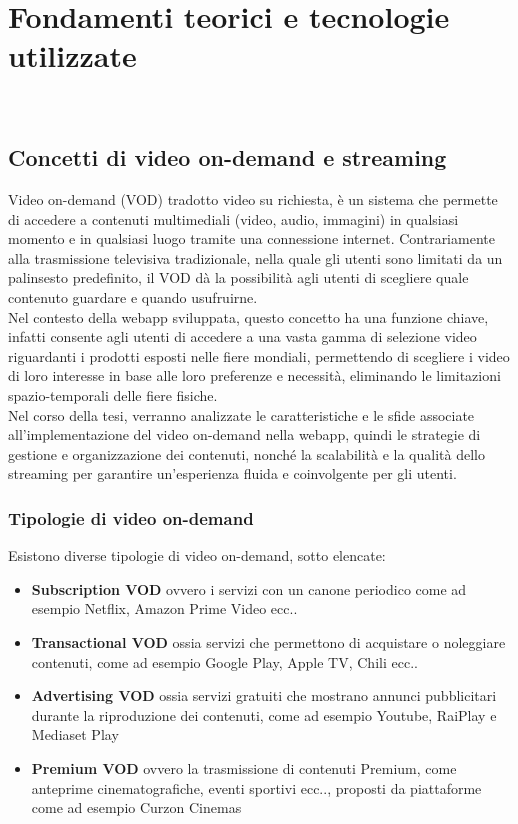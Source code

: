 \chapter{Fondamenti teorici e tecnologie utilizzate}
\label{cap:fondamentiteorici}
\\

\section{Concetti di video on-demand e streaming}
Video on-demand (VOD) tradotto video su richiesta, è un sistema che permette di accedere a contenuti multimediali (video, audio, immagini) 
in qualsiasi momento e in qualsiasi luogo tramite una connessione internet.
Contrariamente alla trasmissione televisiva tradizionale, nella quale gli utenti sono limitati da un palinsesto predefinito, 
il VOD dà la possibilità agli utenti di scegliere quale contenuto guardare e quando usufruirne.\\
Nel contesto della webapp sviluppata, questo concetto ha una funzione chiave, infatti consente agli utenti di accedere a una vasta gamma di selezione video riguardanti 
i prodotti esposti nelle fiere mondiali, 
permettendo di scegliere i video di loro interesse in base alle loro preferenze e necessità, eliminando le limitazioni spazio-temporali delle fiere fisiche.\\
Nel corso della tesi, verranno analizzate le caratteristiche e le sfide associate all'implementazione del video on-demand nella webapp, quindi le strategie 
di gestione e organizzazione dei contenuti, nonché la scalabilità e la qualità dello streaming per garantire un'esperienza fluida e coinvolgente per gli utenti.
\subsection{Tipologie di video on-demand}
Esistono diverse tipologie di video on-demand, sotto elencate:

\begin{itemize}
    \item \textbf{Subscription VOD} ovvero i servizi con un canone periodico come ad esempio Netflix, Amazon Prime Video ecc..\\
    \item \textbf{Transactional VOD} ossia servizi che permettono di acquistare o noleggiare contenuti, come ad esempio Google Play, Apple TV, Chili ecc..\\
    \item \textbf{Advertising VOD} ossia servizi gratuiti che mostrano annunci pubblicitari durante la riproduzione dei contenuti, come ad esempio Youtube, RaiPlay e Mediaset Play\\
    \item \textbf{Premium VOD} ovvero la trasmissione di contenuti Premium, come anteprime cinematografiche, eventi sportivi ecc.., proposti da piattaforme come ad esempio Curzon Cinemas\\
\end{itemize}

